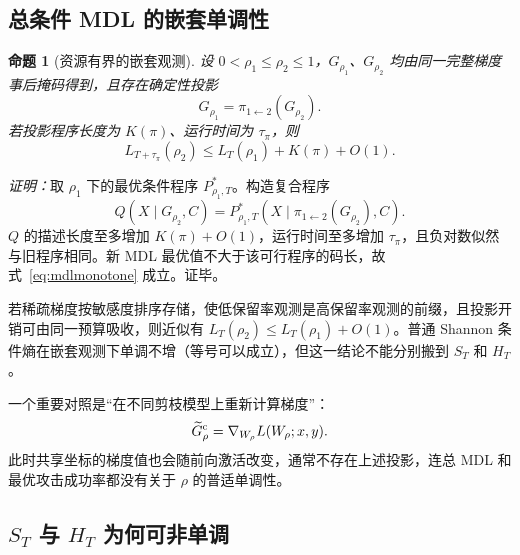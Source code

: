 \documentclass[conference,a4paper]{IEEEtran}
\newtheorem{proposition}{命题}
\begin{document}
\subsection{总条件 MDL 的嵌套单调性}

\begin{proposition}[资源有界的嵌套观测]
设 $0<\rho_1\leq\rho_2\leq1$，$G_{\rho_1}$、$G_{\rho_2}$ 均由同一完整梯度事后掩码得到，且存在确定性投影
\begin{equation}
G_{\rho_1}=\pi_{1\leftarrow2}(G_{\rho_2}).
\end{equation}
若投影程序长度为 $K(\pi)$、运行时间为 $\tau_\pi$，则
\begin{equation}
\boxed{L_{T+\tau_\pi}(\rho_2)
\leq L_T(\rho_1)+K(\pi)+O(1).}
\label{eq:mdlmonotone}
\end{equation}
\end{proposition}

\textit{证明：}取 $\rho_1$ 下的最优条件程序 $P^*_{\rho_1,T}$。构造复合程序
\begin{equation}
Q(X\mid G_{\rho_2},C)=
P^*_{\rho_1,T}(X\mid\pi_{1\leftarrow2}(G_{\rho_2}),C).
\end{equation}
$Q$ 的描述长度至多增加 $K(\pi)+O(1)$，运行时间至多增加 $\tau_\pi$，且负对数似然与旧程序相同。新 MDL 最优值不大于该可行程序的码长，故式~\eqref{eq:mdlmonotone} 成立。证毕。

若稀疏梯度按敏感度排序存储，使低保留率观测是高保留率观测的前缀，且投影开销可由同一预算吸收，则近似有 $L_T(\rho_2)\leq L_T(\rho_1)+O(1)$。普通 Shannon 条件熵在嵌套观测下单调不增（等号可以成立），但这一结论不能分别搬到 $S_T$ 和 $H_T$。

一个重要对照是“在不同剪枝模型上重新计算梯度”：
\begin{equation}
\widetilde G^{\rm c}_\rho=\nabla_{W_\rho}L(W_\rho;x,y).
\end{equation}
此时共享坐标的梯度值也会随前向激活改变，通常不存在上述投影，连总 MDL 和最优攻击成功率都没有关于 $\rho$ 的普适单调性。

\subsection{\texorpdfstring{$S_T$ 与 $H_T$ 为何可非单调}{S_T 与 H_T 为何可非单调}}
\end{document}
